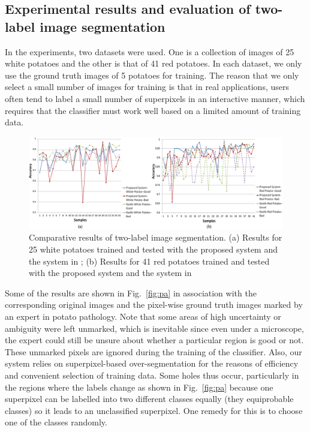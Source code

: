 \documentclass[twocolumn]{svjour3}          %
\begin{document}
\subsection{Experimental results and evaluation of two-label image segmentation}
In the experiments, two datasets were used. One is a collection of images of 25 white potatoes and the other is that of 41 red potatoes. In each dataset, we only use the ground truth images of 5 potatoes for training. The reason that we only select a small number of images for training is that in real applications, users often tend to label a small number of superpixels in an interactive manner, which requires that the classifier must work well based on a limited amount of training data. 
\begin{figure} [t]
\centering
\includegraphics[width=1\linewidth]{ac.jpg}
\caption{Comparative results of two-label image segmentation. (a) Results for 25 white potatoes trained and tested with the proposed system and the system in \cite{SC11}; (b) Results for 41 red potatoes trained and tested with the proposed system and the system in \cite{SC11}}
\label{fig:ac}
\end{figure}

Some of the results are shown in Fig.~\ref{fig:pa} in association with the corresponding original images and the pixel-wise ground truth images marked by an expert in potato pathology. Note that some areas of high uncertainty or ambiguity were left unmarked, which is inevitable since even under a microscope, the expert could still be unsure about whether a particular region is good or not. These unmarked pixels are ignored during the training of the classifier. Also, our system relies on superpixel-based over-segmentation for the reasons of efficiency and convenient selection of training data. Some holes thus occur, particularly in the regions where the labels change as shown in Fig.~\ref{fig:pa} because one superpixel can be labelled into two different classes equally (they equiprobable classes) so it leads to an unclassified superpixel. One remedy for this is to choose one of the classes randomly. 
\end{document}
